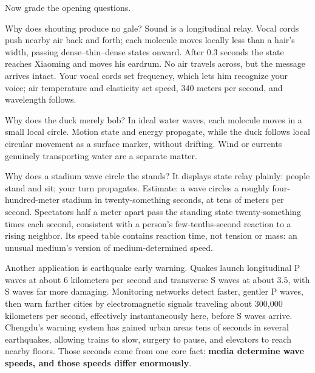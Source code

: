 \begin{mainline}
Now grade the opening questions.

Why does shouting produce no gale? Sound is a longitudinal relay. Vocal cords push nearby air back and forth; each molecule moves locally less than a hair's width, passing dense--thin--dense states onward. After \(0.3\) seconds the state reaches Xiaoming and moves his eardrum. No air travels across, but the message arrives intact. Your vocal cords set frequency, which lets him recognize your voice; air temperature and elasticity set speed, \(340\) meters per second, and wavelength follows.

Why does the duck merely bob? In ideal water waves, each molecule moves in a small local circle. Motion state and energy propagate, while the duck follows local circular movement as a surface marker, without drifting. Wind or currents genuinely transporting water are a separate matter.

Why does a stadium wave circle the stands? It displays state relay plainly: people stand and sit; your turn propagates. Estimate: a wave circles a roughly four-hundred-meter stadium in twenty-something seconds, at tens of meters per second. Spectators half a meter apart pass the standing state twenty-something times each second, consistent with a person's few-tenths-second reaction to a rising neighbor. Its speed table contains reaction time, not tension or mass: an unusual medium's version of medium-determined speed.

Another application is earthquake early warning. Quakes launch longitudinal P waves at about \(6\) kilometers per second and transverse S waves at about \(3.5\), with S waves far more damaging. Monitoring networks detect faster, gentler P waves, then warn farther cities by electromagnetic signals traveling about 300,000 kilometers per second, effectively instantaneously here, before S waves arrive. Chengdu's warning system has gained urban areas tens of seconds in several earthquakes, allowing trains to slow, surgery to pause, and elevators to reach nearby floors. Those seconds come from one core fact: \textbf{media determine wave speeds, and those speeds differ enormously}.
\end{mainline}



